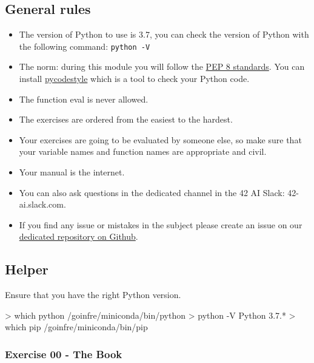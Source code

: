 \documentclass[]{article}
\newenvironment{Shaded}{\begin{snugshade}}{\end{snugshade}}
\newcommand{\NormalTok}[1]{\textcolor[rgb]{0.81,0.81,0.76}{#1}}
\begin{document}
\hypertarget{general-rules}{%
\subsection{General rules}\label{general-rules}}

\begin{itemize}
\item
  The version of Python to use is 3.7, you can check the version of
  Python with the following command: \texttt{python\ -V}
\item
  The norm: during this module you will follow the
  \href{https://www.python.org/dev/peps/pep-0008/}{PEP 8 standards}. You
  can install \href{https://pypi.org/project/pycodestyle}{pycodestyle}
  which is a tool to check your Python code.
\item
  The function eval is never allowed.
\item
  The exercises are ordered from the easiest to the hardest.
\item
  Your exercises are going to be evaluated by someone else, so make sure
  that your variable names and function names are appropriate and civil.
\item
  Your manual is the internet.
\item
  You can also ask questions in the dedicated channel in the 42 AI
  Slack: 42-ai.slack.com.
\item
  If you find any issue or mistakes in the subject please create an
  issue on our
  \href{https://github.com/42-AI/bootcamp_python/issues}{dedicated
  repository on Github}.
\end{itemize}

\hypertarget{helper}{%
\subsection{Helper}\label{helper}}

Ensure that you have the right Python version.

\begin{Shaded}
\begin{Highlighting}[]
\NormalTok{> which python}
\NormalTok{/goinfre/miniconda/bin/python}
\NormalTok{> python -V}
\NormalTok{Python 3.7.*}
\NormalTok{> which pip}
\NormalTok{/goinfre/miniconda/bin/pip}
\end{Highlighting}
\end{Shaded}

\hypertarget{exercise-00---the-book}{%
\subsubsection{Exercise 00 - The Book}\label{exercise-00---the-book}}
\end{document}
